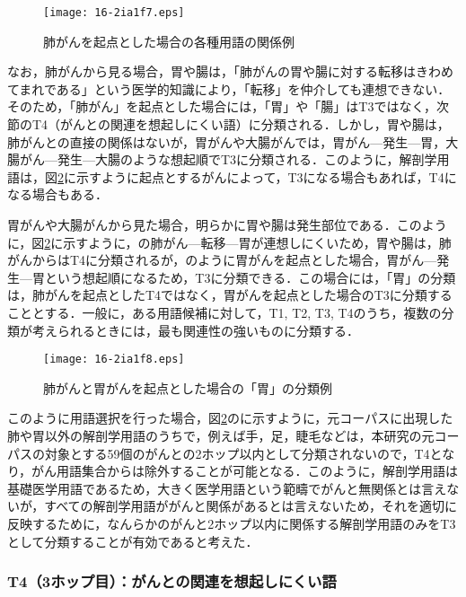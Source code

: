 \documentclass[japanese]{jnlp_1.4}
\def\maru#1{}
\begin{document}
\begin{figure}[t]
 \begin{center}
  \texttt{[image: 16-2ia1f7.eps]}
 \end{center}
 \caption{肺がんを起点とした場合の各種用語の関係例}
 \label{f:007}
\end{figure}

なお，肺がんから見る場合，胃や腸は，「肺がんの胃や腸に対する転移はきわめてまれである」という医学的知識により，「転移」を仲介しても連想できない．そのため，「肺がん」を起点とした場合には，「胃」や「腸」はT3ではなく，次節のT4（がんとの関連を想起しにくい語）に分類される．しかし，胃や腸は，肺がんとの直接の関係はないが，胃がんや大腸がんでは，胃がん—発生—胃，大腸がん—発生—大腸のような想起順でT3に分類される．このように，解剖学用語は，図\ref{f:008}に示すように起点とするがんによって，T3になる場合もあれば，T4になる場合もある．

胃がんや大腸がんから見た場合，明らかに胃や腸は発生部位である．このように，図\ref{f:008}に示すように，\maru{1}の肺がん—転移—胃が連想しにくいため，胃や腸は，肺がんからはT4に分類されるが，\maru{2}のように胃がんを起点とした場合，胃がん—発生—胃という想起順になるため，T3に分類できる．この場合には，「胃」の分類は，肺がんを起点としたT4ではなく，胃がんを起点とした場合のT3に分類することとする．一般に，ある用語候補に対して，T1, T2, T3, T4のうち，複数の分類が考えられるときには，最も関連性の強いものに分類する．

\begin{figure}[t]
 \begin{center}
  \texttt{[image: 16-2ia1f8.eps]}
 \end{center}
 \caption{肺がんと胃がんを起点とした場合の「胃」の分類例}
 \label{f:008}
\end{figure}

このように用語選択を行った場合，図\ref{f:008}の\maru{3}に示すように，元コーパスに出現した肺や胃以外の解剖学用語のうちで，例えば手，足，睫毛などは，本研究の元コーパスの対象とする59個のがんとの2ホップ以内として分類されないので，T4となり，がん用語集合からは除外することが可能となる．このように，解剖学用語は基礎医学用語であるため，大きく医学用語という範疇でがんと無関係とは言えないが，すべての解剖学用語ががんと関係があるとは言えないため，それを適切に反映するために，なんらかのがんと2ホップ以内に関係する解剖学用語のみをT3として分類することが有効であると考えた．


\subsubsection{T4（3ホップ目）：がんとの関連を想起しにくい語}
\label{s:T4（3ホップ目）：がんとの関連を想起しにくい語}
\end{document}
